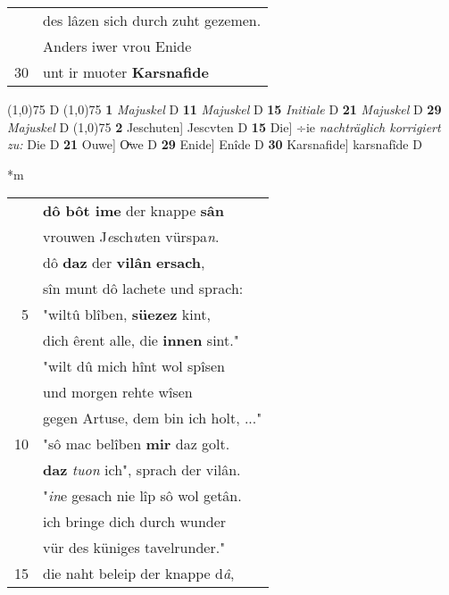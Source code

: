 \documentclass[8pt,a4paper,notitlepage]{article}
\begin{document}
\begin{table}[ht]
\begin{minipage}[t]{0.5\linewidth}
\begin{tabular}{rl}
 & des lâzen sich durch zuht gezemen.\\ 
 & Anders iwer vrou Enide\\ 
30 & unt ir muoter \textbf{Karsnafide}\\ 
\end{tabular}
\scriptsize
\line(1,0){75} \newline
D \newline
\line(1,0){75} \newline
\textbf{1} \textit{Majuskel} D  \textbf{11} \textit{Majuskel} D  \textbf{15} \textit{Initiale} D  \textbf{21} \textit{Majuskel} D  \textbf{29} \textit{Majuskel} D  \newline
\line(1,0){75} \newline
\textbf{2} Jeschuten] Jescvten D \textbf{15} Die] ÷ie \textit{nachträglich korrigiert zu:} Die D \textbf{21} Ouwe] Oͮwe D \textbf{29} Enide] Enîde D \textbf{30} Karsnafide] karsnafîde D \newline
\end{minipage}
\hspace{0.5cm}
\begin{minipage}[t]{0.5\linewidth}
\small
\begin{center}*m
\end{center}
\begin{tabular}{rl}
 & \textbf{dô bôt ime} der knappe \textbf{sân}\\ 
 & vrouwen J\textit{e}sch\textit{u}ten vürspa\textit{n}.\\ 
 & dô \textbf{daz} der \textbf{vilân} \textbf{ersach},\\ 
 & sîn munt dô lachete und sprach:\\ 
5 & "wiltû blîben, \textbf{süezez} kint,\\ 
 & dich êrent alle, die \textbf{innen} sint."\\ 
 & "wilt dû mich hînt wol spîsen\\ 
 & und morgen rehte wîsen\\ 
 & gegen Artuse, dem bin ich holt, ..."\\ 
10 & "sô mac belîben \textbf{mir} daz golt.\\ 
 & \textbf{daz} \textit{tuon} ich", sprach der vilân.\\ 
 & "\textit{in}e gesach nie lîp sô wol getân.\\ 
 & ich bringe dich durch wunder\\ 
 & vür des küniges tavelrunder."\\ 
15 & die naht beleip der knappe d\textit{â},\\ 

\end{tabular}
\end{minipage}
\end{table}
\end{document}
